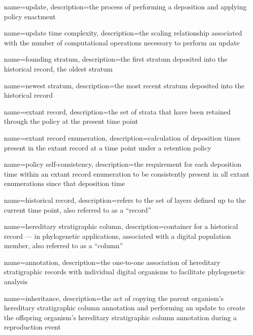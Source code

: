 {
    name=update,
    description={the process of performing a deposition and applying policy enactment}
}

{
    name=update time complexity,
    description={the scaling relationship associated with the number of computational operations necessary to perform an update}
}

{
    name=founding stratum,
    description={the first stratum deposited into the historical record, the oldest stratum}
}

{
    name=newest stratum,
    description={the most recent stratum deposited into the historical record}
}

{
    name=extant record,
    description={the set of strata that have been retained through the policy at the present time point}
}

{
    name=extant record enumeration,
    description={calculation of deposition times present in the extant record at a time point under a retention policy}
}

{
    name=policy self-consistency,
    description={the requirement for each deposition time within an extant record enumeration to be consistently present in all extant enumerations since that deposition time}
}

{
    name=historical record,
    description={refers to the set of layers defined up to the current time point, also referred to as a ``record''}
}

{
    name=hereditary stratigraphic column,
    description={container for a historical record --- in phylogenetic applications, associated with a digital population member, also referred to as a ``column''}
}

{
    name=annotation,
    description={the one-to-one association of hereditary stratigraphic records with individual digital organisms to facilitate phylogenetic analysis}
}

{
    name=inheritance,
    description={the act of copying the parent organism's hereditary stratigraphic column annotation and performing an update to create the offspring organism's hereditary stratigraphic column annotation during a reproduction event}
}


